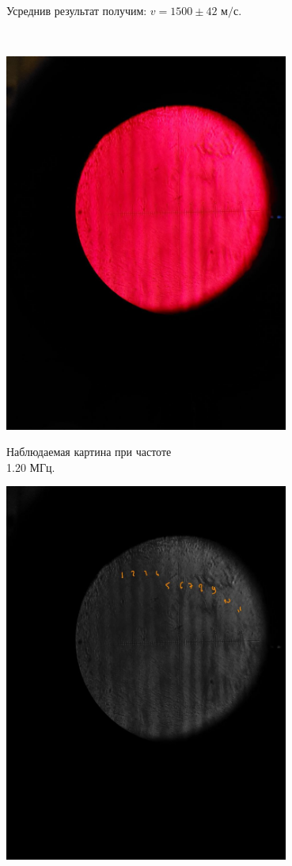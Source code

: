 \documentclass{article}
\begin{document}
\begin{enumerate}
Усреднив результат получим: $v = 1500 \pm 42 \text{ м/с}$. 


\

\newline


\begin{minipage}{0.47\textwidth}
\begin{center}
\includegraphics[width=0.7\textwidth]{red 1.jpg}
	
	Наблюдаемая картина при частоте\\ 1.20 МГц.
\end{center}
\end{minipage}
\begin{minipage}{0.47\textwidth}
\begin{center}
\includegraphics[width=0.7\textwidth]{grey 1.jpg}
	

\end{center}
\end{minipage}
\end{enumerate}
\end{document}

